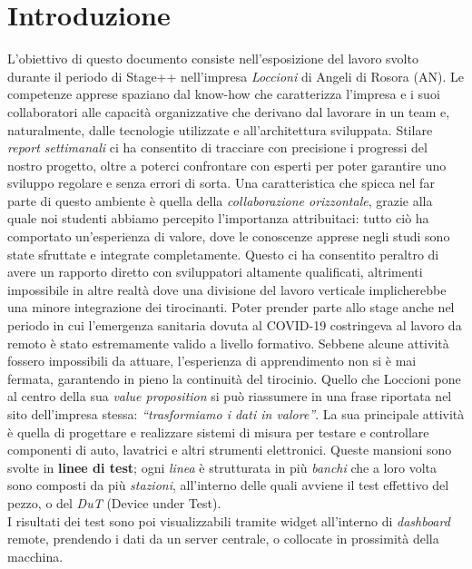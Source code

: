 \chapter{Introduzione}
\label{chap:intro}

L'obiettivo di questo documento consiste nell'esposizione del lavoro svolto durante il periodo di Stage++ nell'impresa \textit{Loccioni} di Angeli di Rosora (AN). Le competenze apprese spaziano dal know-how che caratterizza l'impresa e i suoi collaboratori alle capacità organizzative che derivano dal lavorare in un team e, naturalmente, dalle tecnologie utilizzate e all'architettura sviluppata.
Stilare \textit{report settimanali} ci ha consentito di tracciare con precisione i progressi del nostro progetto, oltre a poterci confrontare con esperti per poter garantire uno sviluppo regolare e senza errori di sorta.
Una caratteristica che spicca nel far parte di questo ambiente è quella della \textit{collaborazione orizzontale}, grazie alla quale noi studenti abbiamo percepito l'importanza attribuitaci: tutto ciò ha comportato un'esperienza di valore, dove le conoscenze apprese negli studi sono state sfruttate e integrate completamente.
Questo ci ha consentito peraltro di avere un rapporto diretto con sviluppatori altamente qualificati, altrimenti impossibile in altre realtà dove una divisione del lavoro verticale implicherebbe una minore integrazione dei tirocinanti.
Poter prender parte allo stage anche nel periodo in cui l'emergenza sanitaria dovuta al COVID-19 costringeva al lavoro da remoto è stato estremamente valido a livello formativo. Sebbene alcune attività fossero impossibili da attuare, l'esperienza di apprendimento non si è mai fermata, garantendo in pieno la continuità del tirocinio.
Quello che Loccioni pone al centro della sua \textit{value proposition} si può riassumere in una frase riportata nel sito dell'impresa stessa: \textit{``trasformiamo i dati in valore''}. \cite{Loccioni}
La sua principale attività è quella di progettare e realizzare sistemi di misura per 
testare e controllare componenti di auto, lavatrici e altri strumenti elettronici.
Queste mansioni sono svolte in \textbf{linee di test}; ogni \textit{linea} è strutturata in più \textit{banchi} che a loro volta sono composti da più \textit{stazioni}, all'interno delle quali avviene 
il test effettivo del pezzo, o del \textit{DuT} (Device under Test).\\
I risultati dei test sono poi visualizzabili tramite widget all'interno di \textit{dashboard} remote, prendendo i dati da un server centrale, 
o collocate in prossimità della macchina.
